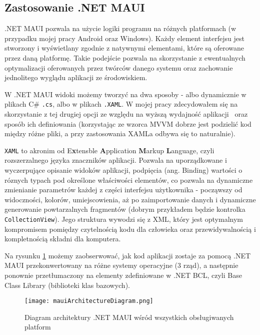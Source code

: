 \subsection{Zastosowanie .NET MAUI}

.NET MAUI pozwala na użycie logiki programu na różnych platformach 
(w przypadku mojej pracy Android oraz Windows).
Każdy element interfejsu jest stworzony i wyświetlany zgodnie z natywnymi elementami, 
które są oferowane przez daną platformę. Takie podejście pozwala na skorzystanie 
z ewentualnych optymalizacji oferowanych przez twórców danego systemu oraz 
zachowanie jednolitego wyglądu aplikacji ze środowiskiem.

W .NET MAUI widoki możemy tworzyć na dwa sposoby - albo dynamicznie w plikach C\# \verb|.cs|, 
albo w plikach \verb|.XAML|. W mojej pracy zdecydowałem się na skorzystanie z tej drugiej opcji 
ze względu na wyższą wydajność aplikacji~\cite{xamlPerformance} oraz sposób ich definiowania 
(korzystając ze wzorca MVVM dobrze jest podzielić kod między różne pliki, 
a przy zastosowania XAMLa odbywa się to naturalnie).

\verb|XAML| to akronim od E\textbf{x}tensble \textbf{A}pplication \textbf{M}arkup \textbf{L}anguage, 
czyli rozszerzalnego języka znaczników aplikacji. Pozwala na uporządkowane i wyczerpujące opisanie 
widoków aplikacji, podpięcia (ang. Binding) wartości o róznych typach pod określone właściwości 
elementów, co pozwala na dynamiczne zmienianie parametrów każdej z części interfejsu użytkownika - 
począwszy od widoczności, kolorów, umiejscowienia, aż po zaimportowanie danych i dynamiczne generowanie 
powtarzalnych fragmentów (dobrym przykładem będzie kontrolka \verb|CollectionView|).
Jego struktura wywodzi się z XML, który jest optymalnym kompromisem pomiędzy czytelnością kodu dla człowieka 
oraz przewidywalnością i kompletnością składni dla komputera.

Na rysunku \ref{img:mauiArchitectureDiagram} możemy zaobserwować, jak kod aplikacji 
zostaje za pomocą .NET MAUI przekonwertowany na różne systemy operacyjne (3 rząd), 
a następnie ponownie przetłumaczony na elementy zdefiniowane w .NET BCL, 
czyli Base Class Library (biblioteki klas bazowych). \\
\begin{figure}[hb]
    \centering
    \texttt{[image: mauiArchitectureDiagram.png]}
    \caption{Diagram architektury .NET MAUI wśród wszystkich obsługiwanych platform~\cite{mauiDefinition}}
    \label{img:mauiArchitectureDiagram}
\end{figure}
